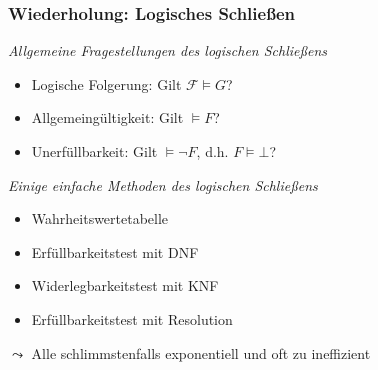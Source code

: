 \documentclass[aspectratio=1610,onlymath]{beamer}
\let\beameroriginaldoublebackslash\\
\let\\=\beameroriginaldoublebackslash
\begin{document}
\maketitle


\begin{frame}\frametitle{Wiederholung: Logisches Schließen}

\emph{Allgemeine Fragestellungen des logischen Schließens}
\begin{itemize}
\item Logische Folgerung: Gilt $\mathcal{F}\models G$?
\item Allgemeingültigkeit: Gilt $\models F$?
\item Unerfüllbarkeit: Gilt $\models \neg F$, d.h. $F\models\bot$?
\end{itemize}\bigskip

\emph{Einige einfache Methoden des logischen Schließens}
\begin{itemize}
\item Wahrheitswertetabelle
\item Erfüllbarkeitstest mit DNF
\item Widerlegbarkeitstest mit KNF
\item Erfüllbarkeitstest mit Resolution
\end{itemize}
$\leadsto$ Alle schlimmstenfalls exponentiell und oft zu ineffizient

\end{frame}

\end{document}
